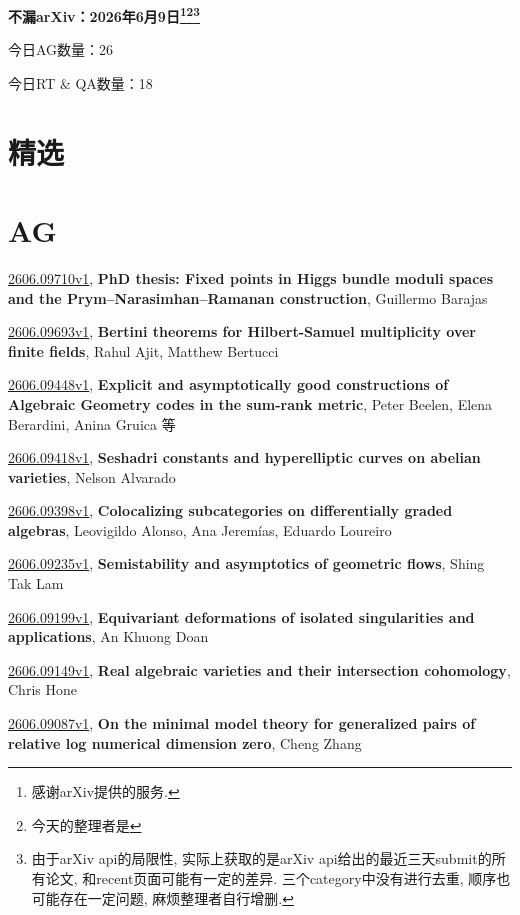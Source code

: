 \documentclass[9pt, a4paper]{article}
\theoremstyle{plain}
\theoremstyle{definition}
\theoremstyle{remark}
\newcommand{\arxiv}[3]{\href{https://arxiv.org/abs/#1}{#1}, \textbf{\textcolor{arxivblue}{#2}}, #3}
\newcommand{\AGnumber}{26}
\newcommand{\RTQAnumber}{18}
\newcommand{\NewestDate}{2026年6月9日}
\newcommand{\todayarXiver}{} %
\begin{document}
\begin{center}
    \Huge\textbf{不漏arXiv：\NewestDate\footnote{感谢arXiv提供的服务.}\footnote{今天的整理者是\todayarXiver}\footnote{由于arXiv api的局限性, 实际上获取的是arXiv api给出的最近三天submit的所有论文, 和recent页面可能有一定的差异. 三个category中没有进行去重, 顺序也可能存在一定问题, 麻烦整理者自行增删.}} \\
\end{center}

\setcounter{section}{-1}

\begin{center}
    今日AG数量：\AGnumber
    
    今日RT \& QA数量：\RTQAnumber
    
\end{center}


\section{精选}


\section{AG}
\arxiv{2606.09710v1}{PhD thesis: Fixed points in Higgs bundle moduli spaces and the Prym--Narasimhan--Ramanan construction}{Guillermo Barajas}

\arxiv{2606.09693v1}{Bertini theorems for Hilbert-Samuel multiplicity over finite fields}{Rahul Ajit, Matthew Bertucci}

\arxiv{2606.09448v1}{Explicit and asymptotically good constructions of Algebraic Geometry codes in the sum-rank metric}{Peter Beelen, Elena Berardini, Anina Gruica 等}

\arxiv{2606.09418v1}{Seshadri constants and hyperelliptic curves on abelian varieties}{Nelson Alvarado}

\arxiv{2606.09398v1}{Colocalizing subcategories on differentially graded algebras}{Leovigildo Alonso, Ana Jeremías, Eduardo Loureiro}

\arxiv{2606.09235v1}{Semistability and asymptotics of geometric flows}{Shing Tak Lam}

\arxiv{2606.09199v1}{Equivariant deformations of isolated singularities and applications}{An Khuong Doan}

\arxiv{2606.09149v1}{Real algebraic varieties and their intersection cohomology}{Chris Hone}

\arxiv{2606.09087v1}{On the minimal model theory for generalized pairs of relative log numerical dimension zero}{Cheng Zhang}
\end{document}
